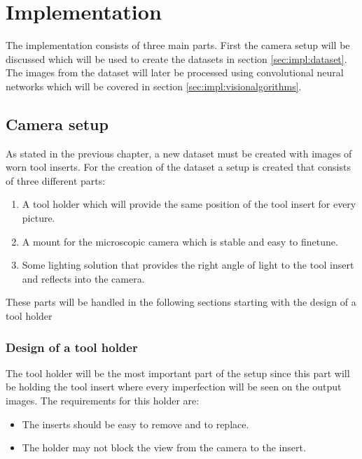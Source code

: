  
\chapter{Implementation}
\label{chap:impl}

The implementation consists of three main parts. First the camera setup will be discussed which will be used to create the datasets in section \ref{sec:impl:dataset}. The images from the dataset will later be processed using convolutional neural networks which will be covered in section \ref{sec:impl:visionalgorithms}.

\section{Camera setup}
\label{sec:impl:camerasetup}
As stated in the previous chapter, a new dataset must be created with images of worn tool inserts. For the creation of the dataset a setup is created that consists of three different parts:
\begin{enumerate}
\item A tool holder which will provide the same position of the tool insert for every picture.
\item A mount for the microscopic camera which is stable and easy to finetune.
\item Some lighting solution that provides the right angle of light to the tool insert and reflects into the camera.
\end{enumerate}

These parts will be handled in the following sections starting with the design of a tool holder 
	\subsection{Design of a tool holder}
	The tool holder will be the most important part of the setup since this part will be holding the tool insert where every imperfection will be seen on the output images. The requirements for this holder are:
	\begin{itemize}
	\item The inserts should be easy to remove and to replace.
	\item The holder may not block the view from the camera to the insert.
\end{itemize}	
	
